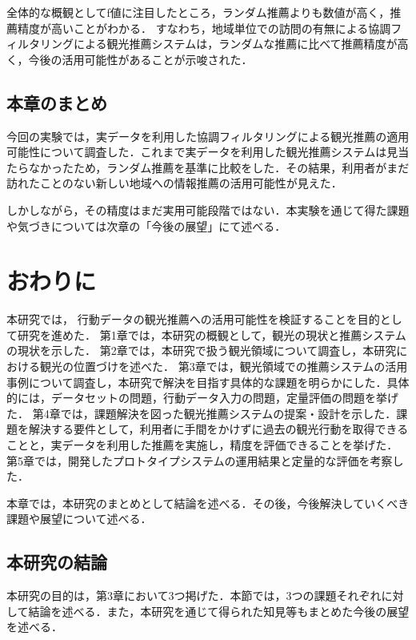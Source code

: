 \documentclass{jsarticle}
\begin{document}
全体的な概観としてf値に注目したところ，ランダム推薦よりも数値が高く，推薦精度が高いことがわかる．
すなわち，地域単位での訪問の有無による協調フィルタリングによる観光推薦システムは，ランダムな推薦に比べて推薦精度が高く，今後の活用可能性があることが示唆された．

\subsection{本章のまとめ}

今回の実験では，実データを利用した協調フィルタリングによる観光推薦の適用可能性について調査した．これまで実データを利用した観光推薦システムは見当たらなかったため，ランダム推薦を基準に比較をした．その結果，利用者がまだ訪れたことのない新しい地域への情報推薦の活用可能性が見えた．

しかしながら，その精度はまだ実用可能段階ではない．本実験を通じて得た課題や気づきについては次章の「今後の展望」にて述べる．

\newpage

\newpage
\section{おわりに}

本研究では， 行動データの観光推薦への活用可能性を検証することを目的として研究を進めた．
第1章では，本研究の概観として，観光の現状と推薦システムの現状を示した．
第2章では，本研究で扱う観光領域について調査し，本研究における観光の位置づけを述べた．
第3章では，観光領域での推薦システムの活用事例について調査し，本研究で解決を目指す具体的な課題を明らかにした．具体的には，データセットの問題，行動データ入力の問題，定量評価の問題を挙げた．
第4章では，課題解決を図った観光推薦システムの提案・設計を示した．課題を解決する要件として，利用者に手間をかけずに過去の観光行動を取得できることと，実データを利用した推薦を実施し，精度を評価できることを挙げた．
第5章では，開発したプロトタイプシステムの運用結果と定量的な評価を考察した．

本章では，本研究のまとめとして結論を述べる．その後，今後解決していくべき課題や展望について述べる．

\newpage

\subsection{本研究の結論}

本研究の目的は，第3章において3つ掲げた．本節では，3つの課題それぞれに対して結論を述べる．また，本研究を通じて得られた知見等もまとめた今後の展望を述べる．
\end{document}
